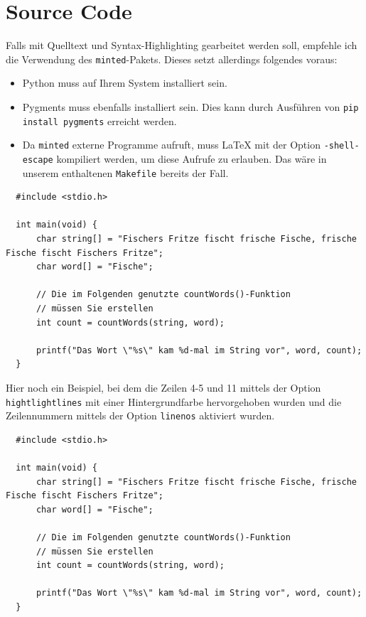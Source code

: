 \section*{Source Code}

Falls mit Quelltext und Syntax-Highlighting gearbeitet werden soll, empfehle ich
die Verwendung des \texttt{minted}-Pakets. Dieses setzt allerdings folgendes
voraus:

\begin{itemize}
  \item Python muss auf Ihrem System installiert sein.
  \item Pygments muss ebenfalls installiert sein. Dies kann durch Ausführen von
  \texttt{pip install pygments} erreicht werden.
  \item Da \texttt{minted} externe Programme aufruft, muss LaTeX mit der Option
  \texttt{-shell-escape} kompiliert werden, um diese Aufrufe zu erlauben. Das
  wäre in unserem enthaltenen \texttt{Makefile} bereits der Fall.
\end{itemize}

\begin{verbatim}
  #include <stdio.h>
  
  int main(void) {
      char string[] = "Fischers Fritze fischt frische Fische, frische Fische fischt Fischers Fritze";
      char word[] = "Fische";
  
      // Die im Folgenden genutzte countWords()-Funktion
      // müssen Sie erstellen
      int count = countWords(string, word);
  
      printf("Das Wort \"%s\" kam %d-mal im String vor", word, count);
  }
\end{verbatim}

Hier noch ein Beispiel, bei dem die Zeilen 4-5 und 11 mittels der Option
\texttt{hightlightlines} mit einer Hintergrundfarbe hervorgehoben wurden und die
Zeilennummern mittels der Option \texttt{linenos} aktiviert wurden.


\begin{verbatim}
  #include <stdio.h>
  
  int main(void) {
      char string[] = "Fischers Fritze fischt frische Fische, frische Fische fischt Fischers Fritze";
      char word[] = "Fische";
  
      // Die im Folgenden genutzte countWords()-Funktion
      // müssen Sie erstellen
      int count = countWords(string, word);
  
      printf("Das Wort \"%s\" kam %d-mal im String vor", word, count);
  }
\end{verbatim}



